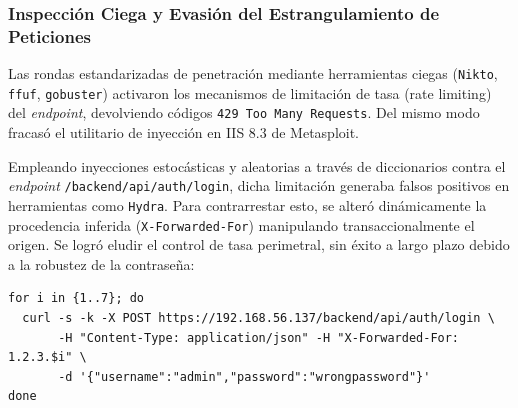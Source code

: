 \subsubsection{Inspección Ciega y Evasión del Estrangulamiento de Peticiones}
Las rondas estandarizadas de penetración mediante herramientas ciegas (\texttt{Nikto}, \texttt{ffuf}, \texttt{gobuster}) activaron los mecanismos de limitación de tasa (rate limiting) del \textit{endpoint}, devolviendo códigos \texttt{429 Too Many Requests}. Del mismo modo fracasó el utilitario de inyección en IIS 8.3 de Metasploit.

Empleando inyecciones estocásticas y aleatorias a través de diccionarios contra el \textit{endpoint} \texttt{/backend/api/auth/login}, dicha limitación generaba falsos positivos en herramientas como \texttt{Hydra}. Para contrarrestar esto, se alteró dinámicamente la procedencia inferida (\texttt{X-Forwarded-For}) manipulando transaccionalmente el origen. Se logró eludir el control de tasa perimetral, sin éxito a largo plazo debido a la robustez de la contraseña:
\begin{lstlisting}
for i in {1..7}; do 
  curl -s -k -X POST https://192.168.56.137/backend/api/auth/login \
       -H "Content-Type: application/json" -H "X-Forwarded-For: 1.2.3.$i" \
       -d '{"username":"admin","password":"wrongpassword"}'
done
\end{lstlisting}

